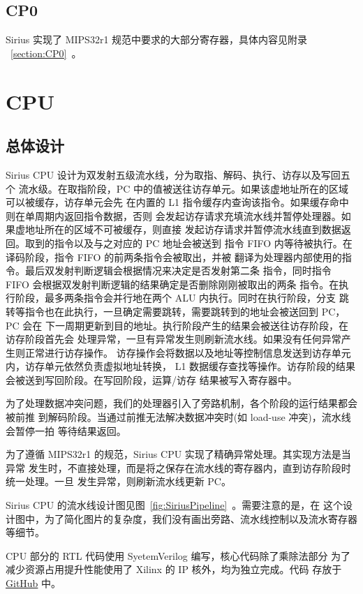 \documentclass[blue,normal,cn,hide]{elegantbook}
\begin{document}
\section{CP0}

Sirius 实现了 MIPS32r1 规范中要求的大部分寄存器，具体内容见附录 ~\ref{section:CP0}~。

\chapter{CPU}

\section{总体设计}

Sirius CPU 设计为双发射五级流水线，分为取指、解码、执行、访存以及写回五个
流水级。在取指阶段，PC 中的值被送往访存单元。如果该虚地址所在的区域可以被缓存，访存单元会先
在内置的 L1 指令缓存内查询该指令。如果缓存命中则在单周期内返回指令数据，否则
会发起访存请求充填流水线并暂停处理器。如果虚地址所在的区域不可被缓存，则直接
发起访存请求并暂停流水线直到数据返回。取到的指令以及与之对应的 PC 地址会被送到
指令 FIFO 内等待被执行。在译码阶段，指令 FIFO 的前两条指令会被取出，并被
翻译为处理器内部使用的指令。最后双发射判断逻辑会根据情况来决定是否发射第二条
指令，同时指令 FIFO 会根据双发射判断逻辑的结果确定是否删除刚刚被取出的两条
指令。在执行阶段，最多两条指令会并行地在两个 ALU 内执行。同时在执行阶段，分支
跳转等指令也在此执行，一旦确定需要跳转，需要跳转到的地址会被送回到 PC，PC 会在
下一周期更新到目的地址。执行阶段产生的结果会被送往访存阶段，在访存阶段首先会
处理异常，一旦有异常发生则刷新流水线。如果没有任何异常产生则正常进行访存操作。
访存操作会将数据以及地址等控制信息发送到访存单元内，访存单元依然负责虚拟地址转换，
L1 数据缓存查找等操作。访存阶段的结果会被送到写回阶段。在写回阶段，运算/访存
结果被写入寄存器中。

为了处理数据冲突问题，我们的处理器引入了旁路机制，各个阶段的运行结果都会被前推
到解码阶段。当通过前推无法解决数据冲突时(如 load-use 冲突)，流水线会暂停一拍
等待结果返回。

为了遵循 MIPS32r1 的规范，Sirius CPU 实现了精确异常处理。其实现方法是当异常
发生时，不直接处理，而是将之保存在流水线的寄存器内，直到访存阶段时统一处理。一旦
发生异常，则刷新流水线更新 PC。

Sirius CPU 的流水线设计图见图~\ref{fig:SiriusPipeline}~。需要注意的是，在
这个设计图中，为了简化图片的复杂度，我们没有画出旁路、流水线控制以及流水寄存器
等细节。

CPU 部分的 RTL 代码使用 SyetemVerilog 编写，核心代码除了乘除法部分
为了减少资源占用提升性能使用了 Xilinx 的 IP 核外，均为独立完成。代码
存放于 \href{https://github.com/name1e5s/Sirius}{GitHub} 中。
\end{document}
